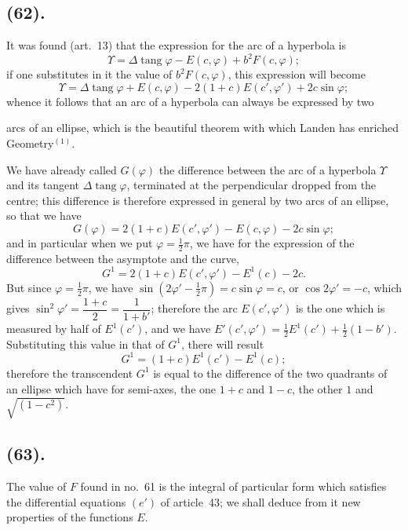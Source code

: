 \documentclass{article}
\begin{document}
\subsection*{(62).}

It was found (art.~13) that the expression for the arc of a hyperbola is
\[ \Upsilon=\Delta\operatorname{tang}\varphi-E(c,\varphi)+b^{2}F(c,\varphi); \]
if one substitutes in it the value of $b^{2}F(c,\varphi)$, this expression will become
\[ \Upsilon=\Delta\operatorname{tang}\varphi+E(c,\varphi)-2(1+c)E(c',\varphi')+2c\sin\varphi; \]
whence it follows that an arc of a hyperbola can always be expressed by two

arcs of an ellipse, which is the beautiful theorem with which Landen has enriched Geometry${}^{(1)}$.

We have already called $G(\varphi)$ the difference between the arc of a hyperbola $\Upsilon$ and its tangent $\Delta\operatorname{tang}\varphi$, terminated at the perpendicular dropped from the centre; this difference is therefore expressed in general by two arcs of an ellipse, so that we have
\[ G(\varphi)=2(1+c)E(c',\varphi')-E(c,\varphi)-2c\sin\varphi; \]
and in particular when we put $\varphi=\frac{1}{2}\pi$, we have for the expression of the difference between the asymptote and the curve,
\[ G^{1}=2(1+c)E(c',\varphi')-E^{1}(c)-2c. \]
But since $\varphi=\frac{1}{2}\pi$, we have $\sin(2\varphi'-\frac{1}{2}\pi)=c\sin\varphi=c$, or $\cos2\varphi'=-c$, which gives $\sin^{2}\varphi'=\dfrac{1+c}{2}=\dfrac{1}{1+b'}$; therefore the arc $E(c',\varphi')$ is the one which is measured by half of $E^{1}(c')$, and we have $E'(c',\varphi')$${}=\frac{1}{2}E^{1}(c')+\frac{1}{2}(1-b')$. Substituting this value in that of $G^{1}$, there will result
\[ G^{1}=(1+c)E^{1}(c')-E^{1}(c); \]
therefore the transcendent $G^{1}$ is equal to the difference of the two quadrants of an ellipse which have for semi-axes, the one $1+c$ and $1-c$, the other $1$ and $\sqrt{(1-c^{2})}$.

\subsection*{(63).}

The value of $F$ found in no.~61 is the integral of particular form which satisfies the differential equations $(e')$ of article~43; we shall deduce from it new properties of the functions $E$.
\end{document}
